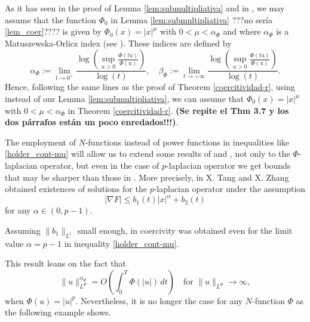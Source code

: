 \documentclass[twoside]{article}
\theoremstyle{remark}
\newcommand{\orlnor}{\|_{L^{\Phi}}}
\renewcommand{\leq}{\leqslant}
\begin{document}
As it has seen in the proof of Lemma \ref{lem:submultipliativa} and in \cite[Lemma 5.2]{ABGMS2015}, 
we may assume that the function $\Phi_0$ 
in Lemma \ref{lem:submultipliativa} ???no ser\'ia \ref{lem_coer}???? 
is given by $\Phi_0(x)=|x|^{\mu}$ with $0<\mu<\alpha_{\Phi}$ and  
where $\alpha_{\Phi}$  is a Matuszewska-Orlicz index (see \cite[Ch. 11]{M}). 
These indices are defined by
\begin{equation}\label{MO_indices}
    \alpha_{\Phi}:=\lim\limits_{t\to 0^{+}}\frac{\log \left (\sup\limits_{u>0}\frac{\Phi(t u)}{\Phi(u)} \right ) }{\log(t)},\quad
    \beta_{\Phi}:=\lim\limits_{t\to +\infty}\frac{\log \left  (\sup\limits_{u>0}\frac{\Phi(t u)}{\Phi(u)}\right )}{\log(t)}.
\end{equation}
Hence, following the same lines  as the proof of Theorem \ref{coercitividad-r},  using \cite[Lemma 5.2]{ABGMS2015} instead of our Lemma \ref{lem:submultipliativa}, we can assume that $\Phi_0(x)=|x|^{\mu}$ with $0<\mu<\alpha_{\Phi}$ in  Theorem \ref{coercitividad-r}.
{\bf (Se repite el Thm 3.7 y los dos p\'arrafos est\'an un poco enredados!!!)}.



 The employment of  $N$-functions instead of power functions in  inequalities like  \eqref{holder_cont-mu}  will allow us to extend some results of   \cite{tang1998periodic} and \cite{tang2010periodic}, not only to the $\Phi$-laplacian operator, but even in the case of  $p$-laplacian operator we get bounds that may be sharper than those in \cite{tang1998periodic,tang2010periodic}. More precisely, in  \cite[Thm. 2.1]{tang2010periodic} X. Tang and X. Zhang obtained existences of solutions for the $p$-laplacian operator under the assumption
 \[|\nabla F|\leq b_1(t) |x|^{\alpha}+b_2(t)\]
 for any $\alpha\in (0,p-1)$.






 Assuming $\|b_1\|_{L^1}$  small enough, in  \cite{zhao2004periodic, tang2010periodic}
coercivity  was obtained even  for the limit value $\alpha=p-1$ in inequality \eqref{holder_cont-mu}.



This result leans on the  fact that
\begin{equation}
 \|u\orlnor^{\alpha_{\Phi}}=O\left(\int_0^T \Phi(|u|)\,dt\right)\quad\text{for } \|u\orlnor\to\infty,
\end{equation}
when  $\Phi(u)=|u|^p$.
Nevertheless, it is no longer the case  for any $N$-function $\Phi$ as the following example shows.
\end{document}
